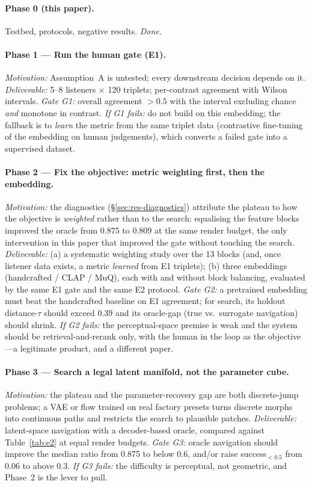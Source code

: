 \documentclass[11pt]{article}
\newcommand{\rGT}{0.875}
\newcommand{\succGT}{0.06}
\begin{document}
\paragraph{Phase 0 (this paper).} Testbed, protocols, negative results.
\emph{Done.}

\paragraph{Phase 1 --- Run the human gate (E1).}
\emph{Motivation:} Assumption~A is untested; every downstream decision depends
on it. \emph{Deliverable:} 5--8 listeners $\times$ 120 triplets; per-contrast
agreement with Wilson intervals. \emph{Gate G1:} overall agreement $> 0.5$ with
the interval excluding chance \emph{and} monotone in contrast.
\emph{If G1 fails:} do not build on this embedding; the fallback is to
\emph{learn} the metric from the same triplet data (contrastive fine-tuning of
the embedding on human judgements), which converts a failed gate into a
supervised dataset.

\paragraph{Phase 2 --- Fix the objective: metric weighting first, then the
embedding.} \emph{Motivation:} the diagnostics (\S\ref{sec:res-diagnostics})
attribute the plateau to how the objective is \emph{weighted} rather than to the
search: equalising the feature blocks improved the oracle from $0.875$ to
$0.809$ at the same render budget, the only intervention in this paper that
improved the gate without touching the search.  \emph{Deliverable:} (a) a
systematic weighting study over the 13 blocks (and, once listener data exists, a
metric \emph{learned} from E1 triplets); (b) three embeddings
(handcrafted / CLAP / MuQ), each with and without block balancing, evaluated by
the same E1 gate and the same E2 protocol. \emph{Gate G2:} a pretrained embedding
must beat the handcrafted baseline on E1 agreement; for search, its holdout
distance-$\tau$ should exceed $0.39$ and its oracle-gap (true vs.\ surrogate
navigation) should shrink. \emph{If G2 fails:} the perceptual-space premise is
weak and the system should be retrieval-and-rerank only, with the human in the
loop as the objective---a legitimate product, and a different paper.

\paragraph{Phase 3 --- Search a legal latent manifold, not the parameter cube.}
\emph{Motivation:} the plateau and the parameter-recovery gap are both
discrete-jump problems; a VAE or flow trained on real factory presets
\cite{vae,flow} turns discrete morphs into continuous paths and restricts the
search to plausible patches. \emph{Deliverable:} latent-space navigation with a
decoder-based oracle, compared against Table~\ref{tab:e2} at equal render
budgets. \emph{Gate G3:} oracle navigation should improve the median ratio from
\rGT{} to below $0.6$, and/or raise success$_{<0.5}$ from \succGT{} to above
$0.3$. \emph{If G3 fails:} the difficulty is perceptual, not geometric, and
Phase~2 is the lever to pull.
\end{document}
